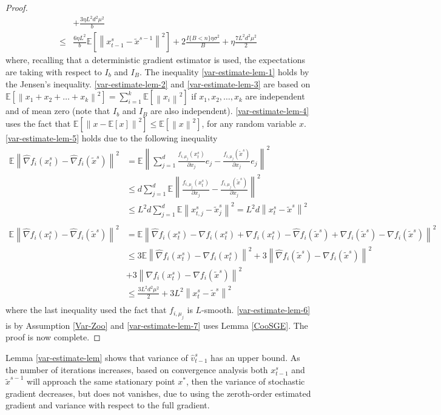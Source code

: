 \documentclass{article}
\newcommand*{\E}{\mathbb{E}}
\newcommand{\norm}[1]{\left\lVert#1\right\rVert}
\theoremstyle{definition}
\theoremstyle{remark}
\begin{document}
\begin{proof}
\begin{align}
   & + \frac{3 \eta L^2 d^2 \mu^2}{b}\\
   \leq  &\label{var-estimate-lem-7}\frac{6\eta L^2}{b}\E\left[\norm{x_{t-1}^s-\tilde{x}^{s-1}}^2\right]+ 2\frac{I\{B < n\}\eta \sigma ^2}{B}+\eta \frac{7L^2 d^2 \mu^2}{2} 
 \end{align}
 where, recalling that a deterministic gradient estimator is used, the expectations are taking with respect to $I_b$ and $I_B$. The inequality \eqref{var-estimate-lem-1} holds by the Jensen’s inequality. \eqref{var-estimate-lem-2} and \eqref{var-estimate-lem-3} are based on $\E[\norm{x_1+x_2+\ldots+x_k}^2] = \sum_{i=1}^k \E[\norm{x_i}^2]$ if $x_1,x_2,\ldots,x_k$ are independent and of mean zero (note that $I_b$ and $I_B$ are also independent). \eqref{var-estimate-lem-4} uses the fact that $\E[\norm{x-\E[x]}^2] \leq \E[\norm{x}^2]$, for any random variable $x$. \eqref{var-estimate-lem-5} holds due to the following inequality  
 \begin{equation}
 \begin{split}
 \E \norm{\hat{\nabla} f_i(x_{t}^s)-\hat{\nabla} f_i(\tilde{x}^s)}^2 &= \E \norm{ \sum_{j=1}^d\frac{f_{i,\mu_j}(x_{t}^s)}{\partial x_j}e_j-\frac{f_{i,\mu_j}(\tilde{x}^s)}{\partial x_j}e_j}^2\\
 &\leq d \sum_{j=1}^d \E \norm{ \frac{f_{i,\mu_j}(x_{t}^s)}{\partial x_j}-\frac{f_{i,\mu_j}(\tilde{x}^s)}{\partial x_j}}^2\\
 &\leq L^2 d \sum_{j=1}^d \E \norm{x_{t,j}^s-\tilde{x}_{j}^s}^2 = L^2 d \norm{x_{t}^s-\tilde{x}^s}^2\\
 \end{split}
 \end{equation}
 {\color{Brown}
 \begin{equation}
 \begin{split}
 \E \norm{\hat{\nabla} f_i(x_{t}^s)-\hat{\nabla} f_i(\tilde{x}^s)}^2 &= \E \norm{ \hat{\nabla} f_i(x_{t}^s)-{\nabla} f_i(x_{t}^s) + {\nabla} f_i(x_{t}^s)-\hat{\nabla} f_i(\tilde{x}^s)+{\nabla} f_i(\tilde{x}^s)-{\nabla} f_i(\tilde{x}^s)}^2\\
 &\leq 3 \E \norm{ \hat{\nabla} f_i(x_{t}^s)-{\nabla} f_i(x_{t}^s)}^2 + 3\norm{\hat{\nabla} f_i(\tilde{x}^s) - {\nabla} f_i(\tilde{x}^s)}^2\\
 &+ 3\norm{{\nabla} f_i(x_{t}^s) - {\nabla} f_i(\tilde{x}^s)}^2\\
 &\leq \frac{3 L^2 d^2 \mu^2}{2} + 3L^2 \norm{x_{t}^s-\tilde{x}^s}^2\\
 \end{split}
 \end{equation}
 }
  where the last inequality used the fact that $f_{i,\mu_j}$ is $L$-smooth. \eqref{var-estimate-lem-6} is by Assumption \ref{Var-Zoo} and \eqref{var-estimate-lem-7} uses Lemma \ref{CooSGE}. The proof is now complete.
\end{proof}
{\color{Green}
Lemma \ref{var-estimate-lem} shows that variance of $\hat{v}_{t-1}^s$ has an upper bound. As the number of iterations increases, based on convergence analysis both $x_{t-1}^s$ and $\tilde{x}^{s-1}$ will approach the same stationary point $x^*$, then the
variance of stochastic gradient decreases, but does not vanishes, due to using the zeroth-order estimated gradient and variance with respect to the full gradient.
}
\end{document}
